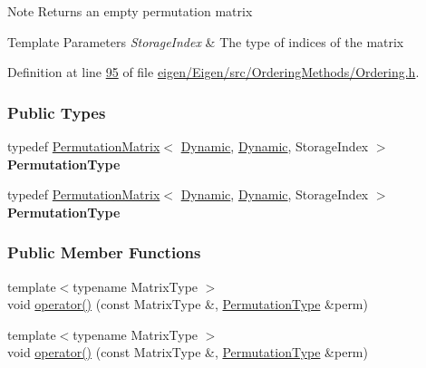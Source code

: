 \begin{DoxyNote}{Note}
Returns an empty permutation matrix 
\end{DoxyNote}

\begin{DoxyTemplParams}{Template Parameters}
{\em Storage\+Index} & The type of indices of the matrix \\
\hline
\end{DoxyTemplParams}


Definition at line \hyperlink{eigen_2_eigen_2src_2_ordering_methods_2_ordering_8h_source_l00095}{95} of file \hyperlink{eigen_2_eigen_2src_2_ordering_methods_2_ordering_8h_source}{eigen/\+Eigen/src/\+Ordering\+Methods/\+Ordering.\+h}.

\subsubsection*{Public Types}
\begin{DoxyCompactItemize}
\item 
\mbox{\label{group___ordering_methods___module_af196b0c294dd9f01c99349bbaee1cd11}} 
typedef \hyperlink{group___core___module_class_eigen_1_1_permutation_matrix}{Permutation\+Matrix}$<$ \hyperlink{namespace_eigen_ad81fa7195215a0ce30017dfac309f0b2}{Dynamic}, \hyperlink{namespace_eigen_ad81fa7195215a0ce30017dfac309f0b2}{Dynamic}, Storage\+Index $>$ {\bfseries Permutation\+Type}
\item 
\mbox{\label{group___ordering_methods___module_af196b0c294dd9f01c99349bbaee1cd11}} 
typedef \hyperlink{group___core___module_class_eigen_1_1_permutation_matrix}{Permutation\+Matrix}$<$ \hyperlink{namespace_eigen_ad81fa7195215a0ce30017dfac309f0b2}{Dynamic}, \hyperlink{namespace_eigen_ad81fa7195215a0ce30017dfac309f0b2}{Dynamic}, Storage\+Index $>$ {\bfseries Permutation\+Type}
\end{DoxyCompactItemize}
\subsubsection*{Public Member Functions}
\begin{DoxyCompactItemize}
\item 
{\footnotesize template$<$typename Matrix\+Type $>$ }\\void \hyperlink{group___ordering_methods___module_aa39e772105ed66da9e909f2a9385be37}{operator()} (const Matrix\+Type \&, \hyperlink{group___core___module}{Permutation\+Type} \&perm)
\item 
{\footnotesize template$<$typename Matrix\+Type $>$ }\\void \hyperlink{group___ordering_methods___module_aa39e772105ed66da9e909f2a9385be37}{operator()} (const Matrix\+Type \&, \hyperlink{group___core___module}{Permutation\+Type} \&perm)
\end{DoxyCompactItemize}


